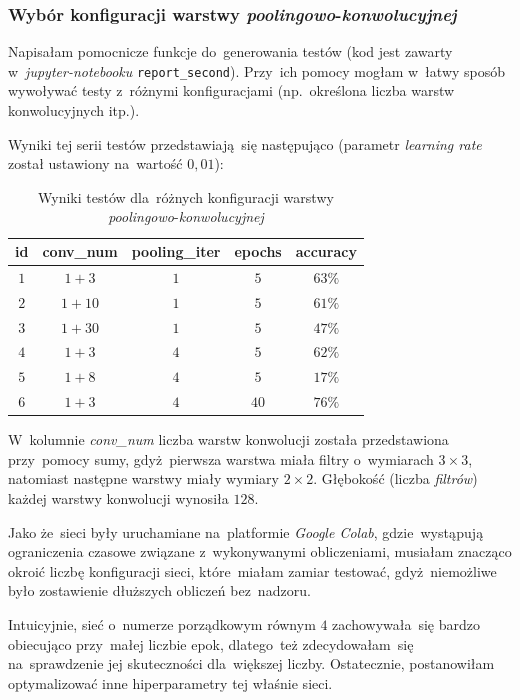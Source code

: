 \documentclass[11pt, a4paper]{article}
\begin{document}
\subsubsection{Wybór konfiguracji warstwy \textit{poolingowo}-\textit{konwolucyjnej}}
Napisałam pomocnicze funkcje do~generowania testów (kod jest zawarty w~\textit{jupyter-notebooku} \texttt{report\_second}). Przy~ich pomocy mogłam w~łatwy sposób wywoływać testy z~różnymi konfiguracjami (np.~określona liczba warstw konwolucyjnych itp.).

Wyniki tej serii testów przedstawiają~się następująco (parametr \textit{learning rate} został ustawiony na~wartość $0,01$):

\begin{table}[H]
    \centering
    \begin{tabular}{|c|c|c|c|c|}
    \hline
      \textbf{id} & \textbf{conv\_num} & \textbf{pooling\_iter} & \textbf{epochs} & \textbf{accuracy} \\
        \hline
    $1$ &    $1 + 3$ & $1$ & $5$ & $63\%$ \\
        \hline
    $2$ &    $1 + 10$ & $1$ & $5$ & $61\%$ \\
        \hline
    $3$ &    $1 + 30$ & $1$ & $5$ & $47\%$ \\
        \hline
    $4$ &    $1 + 3$ & $4$ & $5$ & $62\%$  \\
        \hline
    $5$ &    $1 + 8$ & $4$ & $5$ & $17\%$ \\
    \hline
    $6$ & $1 + 3$ & $4$  & $40$ & $76\%$ \\
    \hline
    \end{tabular}
    \caption{Wyniki testów dla~różnych konfiguracji warstwy \textit{poolingowo}-\textit{konwolucyjnej}}
\end{table}

W~kolumnie \textit{conv\_num} liczba warstw konwolucji została przedstawiona przy~pomocy sumy, gdyż~pierwsza warstwa miała filtry o~wymiarach $3 \times 3$, natomiast następne warstwy miały wymiary $2 \times 2$.
Głębokość (liczba \textit{filtrów}) każdej warstwy konwolucji wynosiła $128$.

Jako że~sieci były uruchamiane na~platformie \textit{Google Colab}, gdzie~wystąpują ograniczenia czasowe związane z~wykonywanymi obliczeniami, musiałam znacząco okroić liczbę konfiguracji sieci, które~miałam zamiar testować, gdyż~niemożliwe było zostawienie dłuższych obliczeń bez~nadzoru.

Intuicyjnie, sieć o~numerze porządkowym równym $4$ zachowywała~się bardzo obiecująco przy~małej liczbie epok, dlatego~też zdecydowałam~się na~sprawdzenie jej skuteczności dla~większej liczby. Ostatecznie, postanowiłam optymalizować inne hiperparametry tej właśnie sieci.
\end{document}
